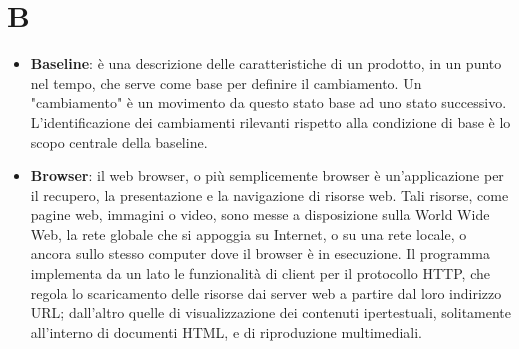 \section{B}
\begin{itemize} 
	\item
	\textbf{Baseline}: è una descrizione delle caratteristiche di un prodotto, in un punto nel tempo, che serve come base per definire il cambiamento. Un "cambiamento" è un movimento da questo stato base ad uno stato successivo. L'identificazione dei cambiamenti rilevanti rispetto alla condizione di base è lo scopo centrale della baseline.
	\item
	\textbf{Browser}: il web browser, o più semplicemente browser è un'applicazione per il recupero, la presentazione e la navigazione di risorse web. Tali risorse, come pagine web, immagini o video, sono messe a disposizione sulla World Wide Web, la rete globale che si appoggia su Internet, o su una rete locale, o ancora sullo stesso computer dove il browser è in esecuzione. Il programma implementa da un lato le funzionalità di client per il protocollo HTTP, che regola lo scaricamento delle risorse dai server web a partire dal loro indirizzo URL; dall'altro quelle di visualizzazione dei contenuti ipertestuali, solitamente all'interno di documenti HTML, e di riproduzione multimediali.
\end{itemize}